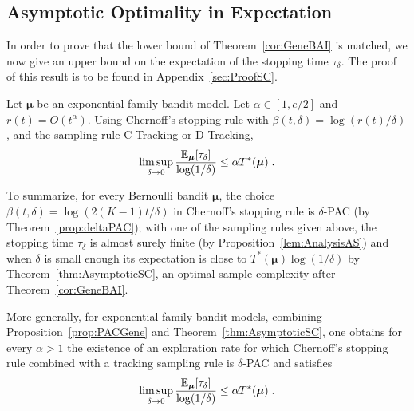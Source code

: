 \documentclass{colt2016} %
\begin{document}
\subsection{Asymptotic Optimality in Expectation}
In order to prove that the lower bound of Theorem~\ref{cor:GeneBAI} is matched, we now give an upper bound on the expectation of the stopping time $\tau_\delta$. The proof of this result is to be found in Appendix~\ref{sec:ProofSC}.

\begin{theorem}\label{thm:AsymptoticSC} Let $\bm\mu$ be an exponential family bandit model. Let $\alpha\in [1,e/2]$ and $r(t) = O(t^\alpha)$. Using Chernoff's stopping rule with $\beta(t,\delta)=\log(r(t)/\delta)$, and the sampling rule C-Tracking or D-Tracking,
\[\limsup_{\delta \rightarrow 0} \frac{\mathbb{E}_{\bm\mu}[\tau_\delta]}{\log(1/\delta)} \leq {\alpha}{T^*(\bm\mu)}\;.\] 
\end{theorem}
%
To summarize, for every Bernoulli bandit $\bm\mu$, the choice $\beta(t,\delta)=\log(2(K-1)t/\delta)$ in Chernoff's stopping rule is $\delta$-PAC (by Theorem~\ref{prop:deltaPAC}); with one of the sampling rules given above, the stopping time $\tau_\delta$ is almost surely finite (by Proposition~\ref{lem:AnalysisAS}) and when $\delta$ is small enough its expectation is close to $T^*(\bm\mu)\log(1/\delta)$ by Theorem~\ref{thm:AsymptoticSC}, an optimal sample complexity after Theorem~\ref{cor:GeneBAI}. 

More generally, for exponential family bandit models, combining Proposition~\ref{prop:PACGene} and Theorem~\ref{thm:AsymptoticSC}, one obtains for every $\alpha>1$ the existence of an exploration rate for which Chernoff's stopping rule combined with a tracking sampling rule is  $\delta$-PAC and satisfies
\[\limsup_{\delta \rightarrow 0} \frac{\mathbb{E}_{\bm\mu}[\tau_\delta]}{\log(1/\delta)} \leq \alpha{T^*(\bm\mu)}\;.\] 
\end{document}
